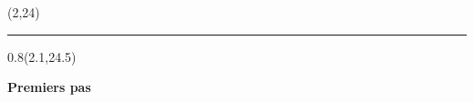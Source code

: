 \begin{frame}[plain]
  \begin{textblock*}{\TPHorizModule}(2\TPHorizModule,24\TPVertModule)
    \textcolor{white}{\rule{\linewidth}{2\TPVertModule}}
  \end{textblock*}

  \begin{textblock*}{0.8\TPHorizModule}(2.1\TPHorizModule,24.5\TPVertModule)
    \raggedright%
    \titles\bfseries
    \fontsize{11}{11}\selectfont
    Premiers pas
  \end{textblock*}
\end{frame}
\endgroup


